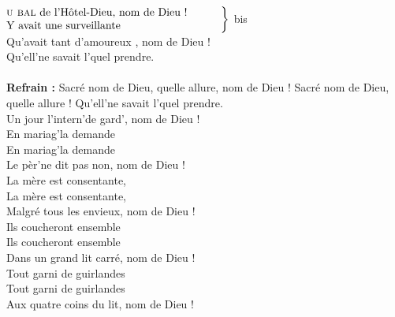 
\\
$\left.\begin{tabular}{l}
\hspace{-0.4cm}
\textsc{u bal}  de l'Hôtel-Dieu, nom de Dieu ! ~~~~~~
\\
\hspace{-0.4cm}
Y avait une surveillante  ~~~~~
\end{tabular}\right\rbrace$ bis
\\Qu'avait tant d'amoureux , nom de Dieu !
\\Qu'ell'ne savait l'quel prendre.
\\\\\textbf{Refrain :}
{Sacré nom de Dieu, quelle allure, nom de Dieu !}
{Sacré nom de Dieu, quelle allure !}
{Qu'ell'ne savait l'quel prendre.}
\\Un jour l'intern'de gard', nom de Dieu !
\\En mariag'la demande 
\\
{En mariag'la demande }
\\Le pèr'ne dit pas non, nom de Dieu !
\\La mère est consentante, 
\\
{La mère est consentante,}
\\Malgré tous les envieux, nom de Dieu !
\\Ils coucheront ensemble 
\\
{Ils coucheront ensemble }
\\Dans un grand lit carré, nom de Dieu !
\\Tout garni de guirlandes 
\\
{Tout garni de guirlandes}
\\Aux quatre coins du lit, nom de Dieu !
